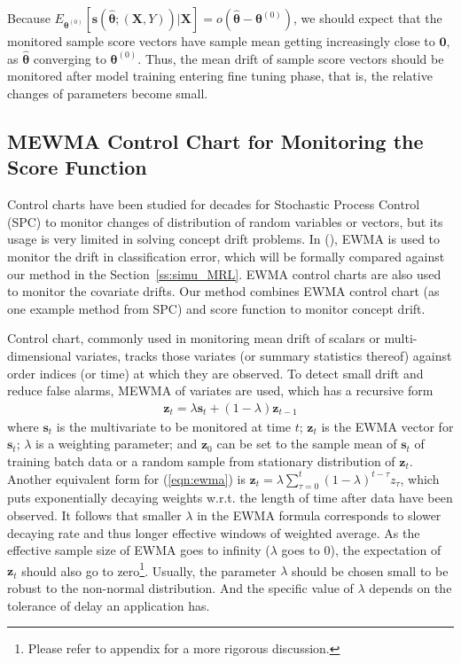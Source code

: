 \documentclass[twoside,11pt]{article}
\begin{document}
Because $E _{\bm { \theta} ^{ (0)}}[\bm{s}(\hat{\bm { \theta}};(\bm {X}, Y))|\bm{X}] = o (\hat{\bm { \theta}} - \bm { \theta}^{ (0)}) $, we should expect that the monitored sample score vectors have sample mean getting increasingly close to $\bm {0}$, as $\hat {\bm { \theta}}$ converging to $\bm { \theta} ^{ (0)}$. Thus, the mean drift of sample score vectors should be monitored after model training entering fine tuning phase, that is, the relative changes of parameters become small.

\subsection{MEWMA Control Chart for Monitoring the Score Function}
\label{ss:MEWMA}
%

Control charts have been studied for decades for Stochastic Process Control (SPC) to monitor changes of distribution of random variables or vectors, but its usage is very limited in solving concept drift problems. In (\cite{ross2012exponentially}), EWMA is used to monitor the drift in classification error, which will be formally compared against our method in the Section~\ref{ss:simu_MRL}. EWMA control charts are also used to monitor the covariate drifts. Our method combines EWMA control chart (as one example method from SPC) and score function to monitor concept drift.

Control chart, commonly used in monitoring mean {drift} of scalars or multi-dimensional variates, tracks those variates (or summary statistics thereof) against order indices (or time) at which they are observed. To detect small {drift} and reduce false alarms, MEWMA of variates are used, which has a recursive form
\begin{align}
\bm {z}_t = \lambda \bm {s}_t + (1 - \lambda) \bm {z} _{t-1}
\label{eqn:ewma}
\end{align}
where $\bm {s}_t$ is the {multivariate} to be monitored at time $t$; {$\bm {z}_t$ is the EWMA vector for $\bm {s}_t$}; $ \lambda$ is a weighting parameter; and $\bm{z}_0$ can be set to the sample mean of $\bm {s}_t$ of training batch data or a random sample from stationary distribution of $\bm {z}_t$. Another equivalent form for (\ref{eqn:ewma}) is $\bm {z}_t = \lambda\sum _{\tau=0}^t (1-\lambda) ^{t-\tau} z _{\tau}$, which puts exponentially decaying weights w.r.t. the length of time after data have been observed. It follows that smaller $\lambda$ in the EWMA formula corresponds to slower decaying rate and thus longer effective windows of weighted average. As the effective sample size of EWMA goes to infinity ($ \lambda$ goes to $0$), the expectation of $\bm {z}_t$ should also go to zero\footnote{Please refer to appendix for a more rigorous discussion.}. Usually, the parameter $\lambda$ should be chosen small to be robust to the non-normal distribution. And the specific value of $\lambda$ depends on the tolerance of delay an application has.
\end{document}

